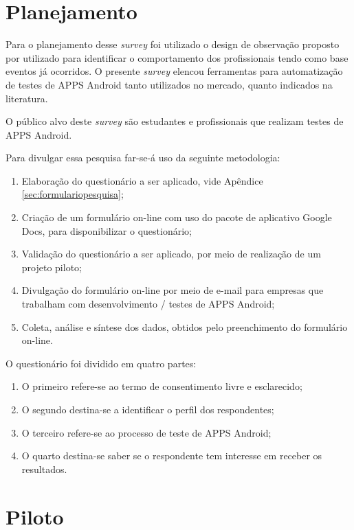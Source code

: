 \section{Planejamento}

Para o planejamento desse \textit{survey} foi utilizado o design de observação proposto por \cite{Kitchenham:2002:PSR:566493.566495} utilizado para identificar o comportamento dos profissionais tendo como base eventos já ocorridos. O presente \textit{survey} elencou ferramentas para automatização de testes de \ac{APPS} Android tanto utilizados no mercado, quanto indicados na literatura.


O público alvo deste \textit{survey} são estudantes e profissionais que realizam testes de \ac{APPS} Android. 


Para divulgar essa pesquisa far-se-á uso da seguinte metodologia:

\begin{enumerate}
    \item Elaboração do questionário a ser aplicado, vide Apêndice \ref{sec:formulariopesquisa};
    \item Criação de um formulário on-line com uso do pacote de aplicativo Google Docs, para disponibilizar o questionário;
    \item Validação do questionário a ser aplicado, por meio de realização de um projeto piloto;
    \item Divulgação do formulário on-line por meio de e-mail para empresas que trabalham com desenvolvimento / testes de \ac{APPS} Android;
    \item Coleta, análise e síntese dos dados, obtidos pelo preenchimento do formulário on-line.
\end{enumerate}


O questionário foi dividido em quatro partes:

\begin{enumerate}
    \item O primeiro refere-se ao termo de consentimento livre e esclarecido;
    \item O segundo destina-se a identificar o perfil dos respondentes;
    \item O terceiro refere-se ao processo de teste de \ac{APPS} Android;
    \item O quarto destina-se saber se o respondente tem interesse em receber os resultados.
\end{enumerate}

\section{Piloto}

